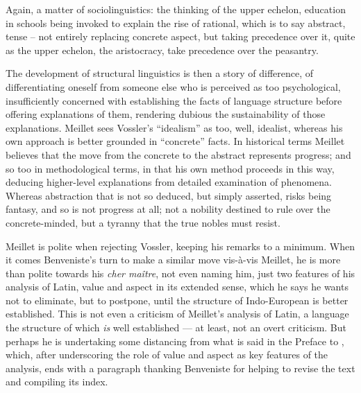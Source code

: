 \documentclass[output=paper]{langscibook}
\begin{document}
Again, a matter of sociolinguistics: the thinking of the upper echelon, education in schools being invoked to explain the rise of rational, which is to say abstract, tense -- not entirely replacing concrete aspect, but taking precedence over it, quite as the upper echelon, the aristocracy, take precedence over the peasantry.

The development of structural linguistics is then a story of difference, of differentiating oneself from someone else who is perceived as too psychological, insufficiently concerned with establishing the facts of language structure before offering explanations of them, rendering dubious the sustainability of those explanations. Meillet sees Vossler's ``idealism'' as too, well, idealist, whereas his own approach is better grounded in ``concrete'' facts. In historical terms Meillet believes that the move from the concrete to the abstract represents progress; and so too in methodological terms, in that his own method proceeds in this way, deducing higher-level explanations from detailed examination of phenomena. Whereas abstraction that is not so deduced, but simply asserted, risks being fantasy, and so is not progress at all; not a nobility destined to rule over the concrete-minded, but a tyranny that the true nobles must resist.

Meillet is polite when rejecting Vossler, keeping his remarks to a minimum. When it comes Benveniste's turn to make a similar move vis-à-vis Meillet, he is more than polite towards his \emph{cher maître}, not even naming him, just two features of his analysis of Latin, value and aspect in its extended sense, which he says he wants not to eliminate, but to postpone, until the structure of Indo-European is better established. This is not even a criticism of Meillet's analysis of Latin, a language the structure of which \emph{is} well established — at least, not an overt criticism. But perhaps he is undertaking some distancing from what is said in the Preface to \citet{Meillet1931}, which, after underscoring the role of value and aspect as key features of the analysis, ends with a paragraph thanking Benveniste for helping to revise the text and compiling its index.
\end{document}
